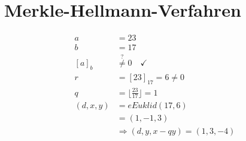 \documentclass{../crypto}
\begin{document}
\section{Merkle-Hellmann-Verfahren}
\begin{align*}
  a         &= 23\\
  b         &= 17\\
  [a]_b     &\stackrel{?}{\neq} 0 \quad \checkmark \\
  r         &=                 [23]_{17} = 6 \neq 0 \\
  q         &=                 \lfloor \frac{23}{17} \rfloor = 1\\
  (d, x, y) &=                 \textit{eEuklid}(17, 6) \\
            &=                 (1, -1, 3) \\
            &\Rightarrow       (d, y, x - qy) = (1, 3, -4)
\end{align*}


%
%
%

\subsection{}
\end{document}
